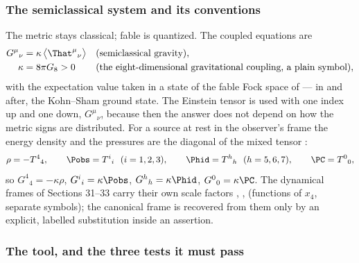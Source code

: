 \subsubsection{The semiclassical system and its conventions}
\label{sec:4.2.1}

The metric stays classical; fable is quantized. The coupled equations are
\begin{align*}
  G^\mu{}_\nu&=\kappa\,\bigl\langle\That^\mu{}_\nu\bigr\rangle &&\text{(semiclassical gravity)},\\
  \kappa&=8\pi G_8>0 &&\text{(the eight-dimensional gravitational coupling, a plain symbol)},
\end{align*}
with the expectation value taken in a state of the fable Fock space of  --- in
 and after, the Kohn--Sham ground state. The Einstein tensor is used with one index up
and one down, $G^\mu{}_\nu$, because then the answer does not depend on how the metric signs are
distributed. For a source at rest in the observer's frame the energy density and the pressures are the
diagonal of the mixed tensor :
\[
  \rho=-T^4{}_4,\qquad \Pobs=T^i{}_i\ \ (i=1,2,3),\qquad \Phid=T^h{}_h\ \ (h=5,6,7),\qquad \PC=T^0{}_0 ,
\]
so $G^4{}_4=-\kappa\rho$, $G^i{}_i=\kappa\Pobs$, $G^h{}_h=\kappa\Phid$, $G^0{}_0=\kappa\PC$. The dynamical
frames of Sections 31--33 carry their own scale factors , , 
(functions of $x_4$, separate symbols); the canonical frame is recovered from them only by an explicit,
labelled substitution inside an assertion.

\subsubsection{The tool, and the three tests it must pass}
\label{sec:4.2.2}

